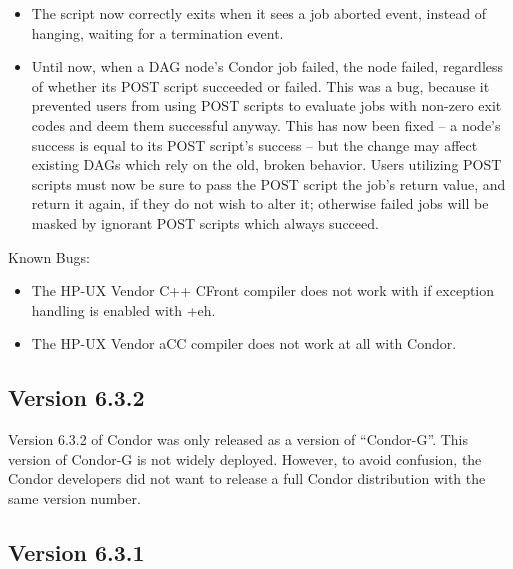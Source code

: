 \begin{itemize}
\item
The  script now correctly exits when it sees a job aborted
event, instead of hanging, waiting for a termination event.

\item
Until now, when a DAG node's Condor job failed, the node failed,
regardless of whether its POST script succeeded or failed.  This was a
bug, because it prevented users from using POST scripts to evaluate
jobs with non-zero exit codes and deem them successful anyway.  This
has now been fixed -- a node's success is equal to its POST script's
success -- but the change may affect existing DAGs which rely on the
old, broken behavior.  Users utilizing POST scripts must now be sure
to pass the POST script the job's return value, and return it again,
if they do not wish to alter it; otherwise failed jobs will be masked
by ignorant POST scripts which always succeed.

\end{itemize}

\noindent Known Bugs:

\begin{itemize}
\item The HP-UX Vendor C++ CFront compiler does not work with 
if exception handling is enabled with +eh.

\item The HP-UX Vendor aCC compiler does not work at all with Condor.
\end{itemize}

\subsection*{\label{sec:New-6-3-2}Version 6.3.2}

Version 6.3.2 of Condor was only released as a version of
``Condor-G''.
This version of Condor-G is not widely deployed.
However, to avoid confusion, the Condor developers did not want to
release a full Condor distribution with the same version number.


\subsection*{\label{sec:New-6-3-1}Version 6.3.1}

